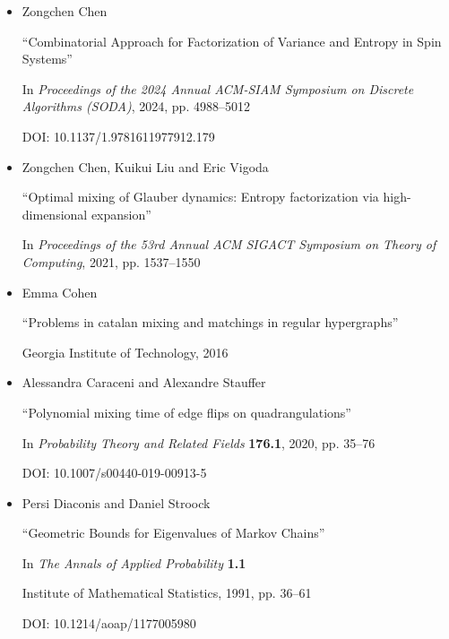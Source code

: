 \begin{itemize}
“A lower bound for the smallest eigenvalue of the Laplacian”

In \emph{Problems in analysis}

Princeton University Press, 2015, pp. 195–200


      

\item[] [Che24]
Zongchen Chen

“Combinatorial Approach for Factorization of Variance and Entropy in Spin Systems”

In \emph{Proceedings of the 2024 Annual ACM-SIAM Symposium on Discrete Algorithms (SODA)}, 2024, pp. 4988–5012

DOI: 10.1137/1.9781611977912.179


      

\item[] [CLV21]
Zongchen Chen, Kuikui Liu and Eric Vigoda

“Optimal mixing of Glauber dynamics: Entropy factorization via high-dimensional expansion”

In \emph{Proceedings of the 53rd Annual ACM SIGACT Symposium on Theory of Computing}, 2021, pp. 1537–1550


      

\item[] [Coh16]
Emma Cohen

“Problems in catalan mixing and matchings in regular hypergraphs”

Georgia Institute of Technology, 2016


      

\item[] [CS20]
Alessandra Caraceni and Alexandre Stauffer

“Polynomial mixing time of edge flips on quadrangulations”

In \emph{Probability Theory and Related Fields} \textbf{176.1}, 2020, pp. 35–76

DOI: 10.1007/s00440-019-00913-5


      

\item[] [DS91]
Persi Diaconis and Daniel Stroock

“Geometric Bounds for Eigenvalues of Markov Chains”

In \emph{The Annals of Applied Probability} \textbf{1.1}

Institute of Mathematical Statistics, 1991, pp. 36–61

DOI: 10.1214/aoap/1177005980



\end{itemize}
